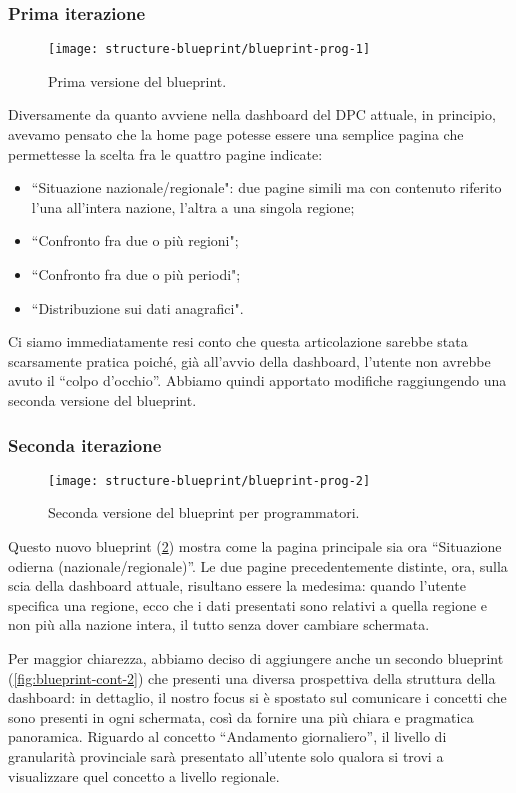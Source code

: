 \subsubsection{Prima iterazione}
\begin{figure}[H]
    \centering
    \texttt{[image: structure-blueprint/blueprint-prog-1]}
    \caption{Prima versione del blueprint.}\label{fig:blueprint-prog-1}
\end{figure}
Diversamente da quanto avviene nella dashboard del DPC attuale, in principio, avevamo pensato che la home page potesse essere una semplice pagina che permettesse la scelta fra le quattro pagine indicate:
\begin{itemize}
    \item ``Situazione nazionale/regionale": due pagine simili ma con contenuto riferito l'una all'intera nazione, l'altra a una singola regione;
    \item ``Confronto fra due o più regioni";
    \item ``Confronto fra due o più periodi";
    \item ``Distribuzione sui dati anagrafici".
\end{itemize}
Ci siamo immediatamente resi conto che questa articolazione sarebbe stata scarsamente pratica poiché, già all'avvio della dashboard, l'utente non avrebbe avuto il ``colpo d'occhio''. Abbiamo quindi apportato modifiche raggiungendo una seconda versione del blueprint.

\subsubsection{Seconda iterazione}\label{ss:seconda-iterazione}
\begin{figure}[H]
    \centering
    \texttt{[image: structure-blueprint/blueprint-prog-2]}
    \caption{Seconda versione del blueprint per programmatori.}\label{fig:blueprint-prog-2}
\end{figure}
Questo nuovo blueprint (\ref{fig:blueprint-prog-2}) mostra come la pagina principale sia ora ``Situazione odierna (nazionale/regionale)''. Le due pagine precedentemente distinte, ora, sulla scia della dashboard attuale, risultano essere la medesima: quando l'utente specifica una regione, ecco che i dati presentati sono relativi a quella regione e non più alla nazione intera, il tutto senza dover cambiare schermata.
\clearpage

Per maggior chiarezza, abbiamo deciso di aggiungere anche un secondo blueprint (\ref{fig:blueprint-cont-2}) che presenti una diversa prospettiva della struttura della dashboard: in dettaglio, il nostro focus si è spostato sul comunicare i concetti che sono presenti in ogni schermata, così da fornire una più chiara e pragmatica panoramica.
Riguardo al concetto ``Andamento giornaliero'', il livello di granularità provinciale sarà presentato all'utente solo qualora si trovi a visualizzare quel concetto a livello regionale.

